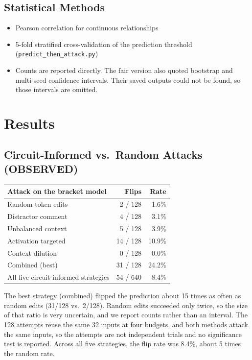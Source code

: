 \documentclass[11pt]{article}
\newcommand{\lab}[1]{{\footnotesize\MakeUppercase{#1}}}
\newcommand{\observed}{\lab{observed}}
\begin{document}
\subsection{Statistical Methods}
\begin{itemize}
  \item Pearson correlation for continuous relationships
  \item 5-fold stratified cross-validation of the prediction threshold (\texttt{predict\_then\_attack.py})
  \item Counts are reported directly. The fair version also quoted bootstrap and multi-seed confidence intervals. Their saved outputs could not be found, so those intervals are omitted.
\end{itemize}

\section{Results}\label{sec:results}

\subsection{Circuit-Informed vs.\ Random Attacks (\observed)}
\begin{center}
\small
\begin{tabular}{@{}lrr@{}}
\toprule
Attack on the bracket model & Flips & Rate \\
\midrule
Random token edits & 2 / 128 & 1.6\% \\
Distractor comment & 4 / 128 & 3.1\% \\
Unbalanced context & 5 / 128 & 3.9\% \\
Activation targeted & 14 / 128 & 10.9\% \\
Context dilution & 0 / 128 & 0.0\% \\
Combined (best) & 31 / 128 & 24.2\% \\
\midrule
All five circuit-informed strategies & 54 / 640 & 8.4\% \\
\bottomrule
\end{tabular}
\end{center}
The best strategy (combined) flipped the prediction about 15 times as often as random edits (31/128 vs.\ 2/128). Random edits succeeded only twice, so the size of that ratio is very uncertain, and we report counts rather than an interval. The 128 attempts reuse the same 32 inputs at four budgets, and both methods attack the same inputs, so the attempts are not independent trials and no significance test is reported. Across all five strategies, the flip rate was 8.4\%, about 5 times the random rate.
\end{document}
